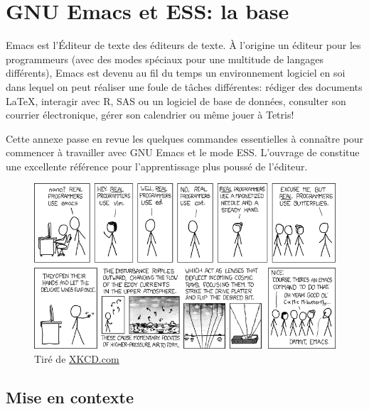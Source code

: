 \chapter{GNU Emacs et ESS: la base}
\label{emacs+ess}

Emacs est l'Éditeur de texte des éditeurs de texte. À l'origine un
éditeur pour les programmeurs (avec des modes spéciaux pour une
multitude de langages différents), Emacs est devenu au fil du temps un
environnement logiciel en soi dans lequel on peut réaliser une foule
de tâches différentes: rédiger des documents \LaTeX, interagir avec R,
SAS ou un logiciel de base de données, consulter son courrier
électronique, gérer son calendrier ou même jouer à Tetris!

Cette annexe passe en revue les quelques commandes essentielles à
connaître pour commencer à travailler avec GNU Emacs et le mode ESS.
L'ouvrage de \cite{Cameron:Emacs:2004} constitue une excellente
référence pour l'apprentissage plus poussé de l'éditeur.

\begin{figure}[t]
  \centering
  \includegraphics{emacs.png} \\
  \footnotesize\sffamily\flushleft\vspace{-\baselineskip}%
  Tiré de \href{http://xkcd.com/378/}{XKCD.com}
\end{figure}

\section{Mise en contexte}
\label{emacs+ess:contexte}

